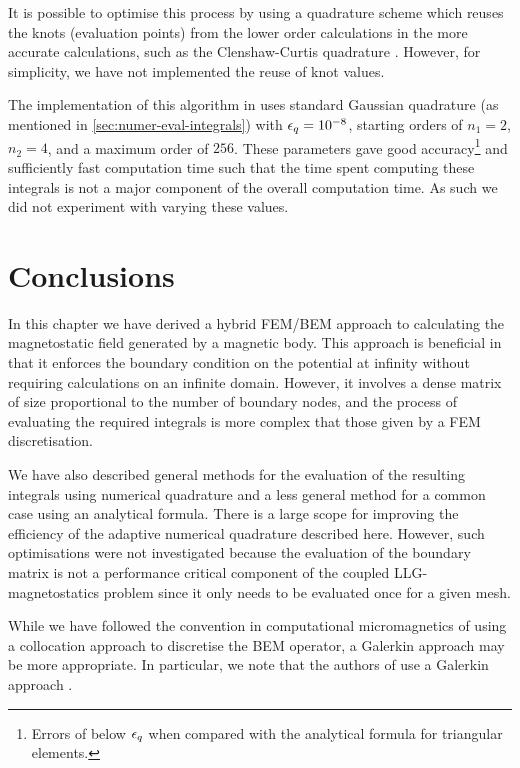 It is possible to optimise this process by using a quadrature scheme which reuses the knots (\ie evaluation points) from the lower order calculations in the more accurate calculations, such as the Clenshaw-Curtis quadrature \cite{Trefethen2008}.
However, for simplicity, we have not implemented the reuse of knot values.

The implementation of this algorithm in \oomph uses standard Gaussian quadrature (as mentioned in \cref{sec:numer-eval-integrals}) with $\epsilon_q = 10^{-8}$, starting orders of $n_1=2$, $n_2=4$, and a maximum order of $256$.
These parameters gave good accuracy\footnote{Errors of below $\epsilon_q$ when compared with the analytical formula for triangular elements.} and sufficiently fast computation time such that the time spent computing these integrals is not a major component of the overall computation time.
As such we did not experiment with varying these values.


\section{Conclusions}

In this chapter we have derived a hybrid FEM/BEM approach to calculating the magnetostatic field generated by a magnetic body.
This approach is beneficial in that it enforces the boundary condition on the potential at infinity without requiring calculations on an infinite domain.
However, it involves a dense matrix of size proportional to the number of boundary nodes, and the process of evaluating the required integrals is more complex that those given by a FEM discretisation.

We have also described general methods for the evaluation of the resulting integrals using numerical quadrature and a less general method for a common case using an analytical formula.
There is a large scope for improving the efficiency of the adaptive numerical quadrature described here.
However, such optimisations were not investigated because the evaluation of the boundary matrix is not a performance critical component of the coupled LLG-magnetostatics problem since it only needs to be evaluated once for a given mesh.

While we have followed the convention in computational micromagnetics of using a collocation approach to discretise the BEM operator, a Galerkin approach may be more appropriate.
In particular, we note that the authors of \hlib use a Galerkin approach \cite{Borm2003}.

